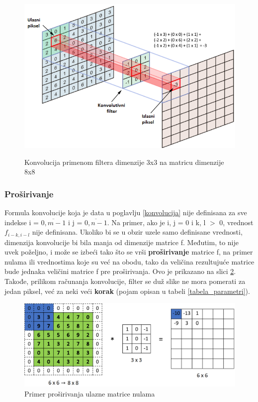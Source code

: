 \documentclass[a4paper]{article}
\begin{document}
\begin{figure}[h!]
\caption{Konvolucija primenom filtera dimenzije 3x3 na matricu dimenzije 8x8}
\centering
\includegraphics[scale=0.9]{convolution.png}
\label{fig:convolution}
\end{figure}

\subsubsection{Proširivanje}
\label{prosirivanje}

Formula konvolucije koja je data u poglavlju \ref{konvolucija} nije definisana za sve indekse i = $\overline{0, m-1}$ i j = $\overline{0, n-1}$. Na primer, ako je i, j = 0 i k, l $>$ 0, vrednost $f_{i-k, i-l}$ nije definisana. Ukoliko bi se u obzir uzele samo definisane vrednosti, dimenzija konvolucije bi bila manja od dimenzije matrice f. Međutim, to nije uvek poželjno, i može se izbeći tako što se vrši \textbf{proširivanje} matrice f, na primer nulama ili vrednostima koje su već na obodu, tako da veličina rezultujuće matrice bude jednaka veličini matrice f pre proširivanja. Ovo je prikazano na slici \ref{fig:padding}. Takođe, prilikom računanja konvolucije, filter se duž slike ne mora pomerati za jedan piksel, već za neki veći \textbf{korak} (pojam opisan u tabeli \ref{tabela_parametri}).

\begin{figure}[h!]
\begin{center}
\includegraphics[scale=0.38]{padding.png}
\end{center}
\caption{Primer proširivanja ulazne matrice nulama}
\label{fig:padding}
\end{figure}
\end{document}
